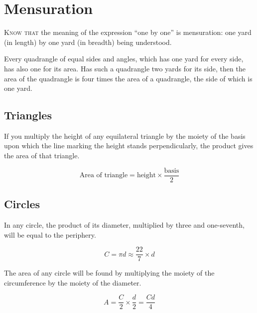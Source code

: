 \documentclass[11pt,a4paper,openany,oneside]{book}
\begin{document}
\newpage

\chapter{Mensuration}
\label{ch:mensuration}

\lettrine[lines=3, lhang=0.33, nindent=0em, findent=3pt]{
\textcolor{dropgold}{K}}{now that} the meaning of the expression ``one by one'' is mensuration: one
yard (in length) by one yard (in breadth) being understood.

Every quadrangle of equal sides and angles, which has one yard for every
side, has also one for its area. Has such a quadrangle two yards for its
side, then the area of the quadrangle is four times the area of a quadrangle,
the side of which is one yard.

\section*{Triangles}

If you multiply the height of any equilateral triangle by the moiety of the
basis upon which the line marking the height stands perpendicularly, the
product gives the area of that triangle.

\begin{equation}
\text{Area of triangle} = \text{height} \times \frac{\text{basis}}{2}
\end{equation}

\section*{Circles}

In any circle, the product of its diameter, multiplied by three and
one-seventh, will be equal to the periphery.

\begin{equation}
C = \pi d \approx \frac{22}{7} \times d
\end{equation}

The area of any circle will be found by multiplying the moiety of the
circumference by the moiety of the diameter.

\begin{equation}
A = \frac{C}{2} \times \frac{d}{2} = \frac{Cd}{4}
\end{equation}
\end{document}

